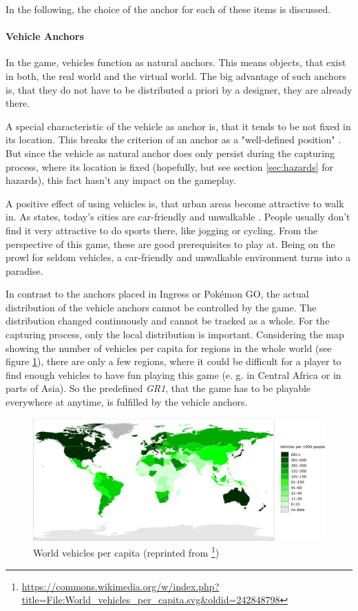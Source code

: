 In the following, the choice of the anchor for each of these items is discussed.

\paragraph{Vehicle Anchors}
In the game, vehicles function as natural anchors. This means objects, that exist in both, the real world and the virtual world. The big advantage of such anchors is, that they do not have to be distributed a priori by a designer, they are already there.

A special characteristic of the vehicle as anchor is, that it tends to be not fixed in its location. This breaks the criterion of an anchor as a "well-defined position" \citep{hock2014augmented}. But since the vehicle as natural anchor does only persist during the capturing process, where its location is fixed (hopefully, but see section \ref{sec:hazards} for hazards), this fact hasn't any impact on the gameplay.

A positive effect of using vehicles is, that urban areas become attractive to walk in. As \citeauthor{gehl2013cities} states, today's cities are car-friendly and unwalkable \citep{gehl2013cities}. People usually don't find it very attractive to do sports there, like jogging or cycling. From the perspective of this game, these are good prerequisites to play at. Being on the prowl for seldom vehicles, a car-friendly and unwalkable environment turns into a paradise.

In contrast to the anchors placed in Ingress or Pok\'{e}mon GO, the actual distribution of the vehicle anchors cannot be controlled by the game. The distribution changed continuously and cannot be tracked as a whole. For the capturing process, only the local distribution is important. Considering the map showing the number of vehicles per capita for regions in the whole world (see figure \ref{fig:worldVehicles}), there are only a few regions, where it could be difficult for a player to find enough vehicles to have fun playing this game (e. g. in Central Africa or in parts of Asia). So the predefined \emph{GR1}, that the game has to be playable everywhere at anytime, is fulfilled by the vehicle anchors.

\begin{figure}[btph]
  \centering
        \includegraphics[width=.95\linewidth]{gfx/world_vehicles_per_capita}
        \caption{World vehicles per capita (reprinted from \footnote{\url{https://commons.wikimedia.org/w/index.php?title=File:World_vehicles_per_capita.svg&oldid=242848798}})}
        \label{fig:worldVehicles}
\end{figure}

